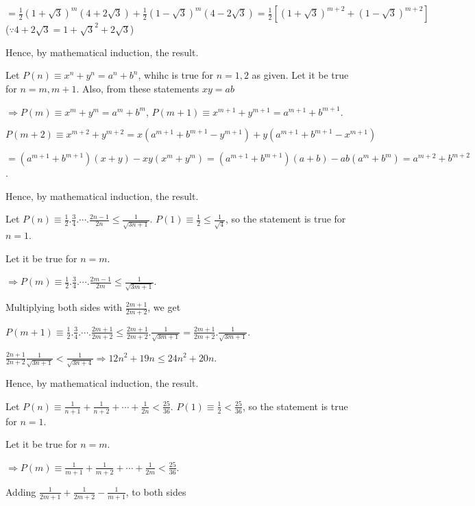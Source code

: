   $= \frac{1}{2}(1 + \sqrt{3})^m(4 + 2\sqrt{3}) + \frac{1}{2}(1 - \sqrt{3})^m(4 - 2\sqrt{3}) =
  \frac{1}{2}[(1 + \sqrt{3})^{m + 2} + (1 - \sqrt{3})^{m + 2}]$ ($\because 4 + 2\sqrt{3} = 1 + \sqrt{3}^2 +
  2\sqrt{3}$)

  Hence, by mathematical induction, the result.
\item Let $P(n)\equiv x^n + y^n = a^n + b^n$, whihc is true for $n = 1, 2$ as given. Let it be true for $n =
  m, m + 1$. Also, from these statements $xy = ab$

  $\Rightarrow P(m)\equiv x^m + y^m = a^m + b^m$, $P(m + 1) \equiv x^{m + 1} + y^{m + 1} = a^{m + 1} + b^{m + 1}$.

  $P(m + 2)\equiv x^{m + 2} + y^{m + 2} = x(a^{m + 1} + b^{m + 1} - y^{m + 1}) + y(a^{m + 1} + b^{m + 1} -
  x^{m + 1})$

  $= (a^{m + 1} + b^{m + 1})(x + y) - xy(x^m + y^m) = (a^{m + 1} + b^{m + 1})(a + b) - ab(a^m + b^m) = a^{m
    + 2} + b^{m + 2}$.

  Hence, by mathematical induction, the result.
\item Let $P(n) \equiv \frac{1}{2}.\frac{3}{4}.\cdots.\frac{2n - 1}{2n}\leq \frac{1}{\sqrt{3n +
    1}}$. $P(1)\equiv \frac{1}{2}\leq \frac{1}{\sqrt{4}}$, so the statement is true for $n = 1$.

  Let it be true for $n = m$.

  $\Rightarrow P(m)\equiv \frac{1}{2}.\frac{3}{4}.\cdots.\frac{2m - 1}{2m}\leq \frac{1}{\sqrt{3m + 1}}$.

  Multiplying both sides with $\frac{2m + 1}{2m + 2}$, we get

  $P(m + 1) \equiv \frac{1}{2}.\frac{3}{4}.\cdots.\frac{2m + 1}{2m + 2}\leq \frac{2m + 1}{2m +
    2}.\frac{1}{\sqrt{3m + 1}} = \frac{2m + 1}{2m + 2}.\frac{1}{\sqrt{3m + 1}}$.

  $\frac{2n + 1}{2n + 2}\frac{1}{\sqrt{3n + 1}} < \frac{1}{\sqrt{3n + 4}} \Rightarrow 12n^2 + 19n \leq 24n^2
  + 20n$.

  Hence, by mathematical induction, the result.
\item Let $P(n)\equiv \frac{1}{n + 1} + \frac{1}{n + 2} + \cdots + \frac{1}{2n} <
  \frac{25}{36}$. $P(1)\equiv \frac{1}{2} < \frac{25}{36}$, so the statement is true for $n = 1$.

  Let it be true for $n = m$.

  $\Rightarrow P(m)\equiv \frac{1}{m + 1} + \frac{1}{m + 2} + \cdots + \frac{1}{2m} < \frac{25}{36}$.

  Adding $\frac{1}{2m + 1} + \frac{1}{2m + 2} - \frac{1}{m + 1}$, to both sides

